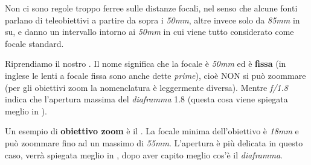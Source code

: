 \nb Non ci sono regole troppo ferree sulle distanze focali, nel senso che alcune fonti parlano di teleobiettivi a partire da sopra i \textit{50mm}, altre invece solo da \textit{85mm} in su, e danno un intervallo intorno ai \textit{50mm} in cui viene tutto considerato come focale standard.

Riprendiamo il nostro .\newline
Il nome significa che la focale è \textit{50mm} ed è \textbf{fissa} (in inglese le lenti a focale fissa sono anche dette \textit{prime}), cioè NON si può zoommare (per gli obiettivi zoom la nomenclatura è leggermente diversa).
Mentre \textit{f/1.8} indica che l'apertura massima del \textit{diaframma} 1.8 (questa cosa viene spiegata meglio in ).

Un esempio di \textbf{obiettivo zoom} è il .\newline
La focale minima dell'obiettivo è \textit{18mm} e può zoommare fino ad un massimo di \textit{55mm}.\newline
L'apertura è più delicata in questo caso, verrà spiegata meglio in , dopo aver capito meglio cos'è il \textit{diaframma}.